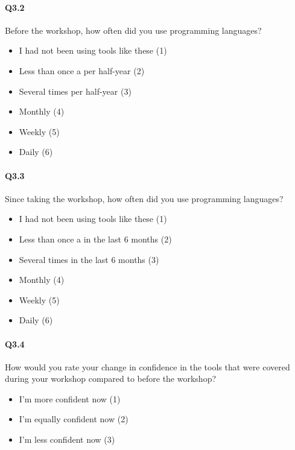 \documentclass[030-workshop.tex]{subfiles}
\begin{document}
    \paragraph{Q3.2}

        Before the workshop, how often did you use programming languages?

        \begin{itemize}
            \item I had not been using tools like these  (1)
            \item Less than once a per half-year  (2)
            \item Several times per half-year  (3)
            \item Monthly  (4)
            \item Weekly  (5)
            \item Daily  (6)
        \end{itemize}

    \paragraph{Q3.3}

        Since taking the workshop, how often did you use programming languages?

        \begin{itemize}
            \item I had not been using tools like these  (1)
            \item Less than once a in the last 6 months  (2)
            \item Several times in the last 6 months  (3)
            \item Monthly  (4)
            \item Weekly  (5)
            \item Daily  (6)
        \end{itemize}

    \paragraph{Q3.4}

        How would you rate your change in confidence in the tools that were covered during your workshop compared to before the workshop?
        \begin{itemize}
            \item I'm more confident now  (1)
            \item I'm equally confident now  (2)
            \item I'm less confident now  (3)
        \end{itemize}
\end{document}
